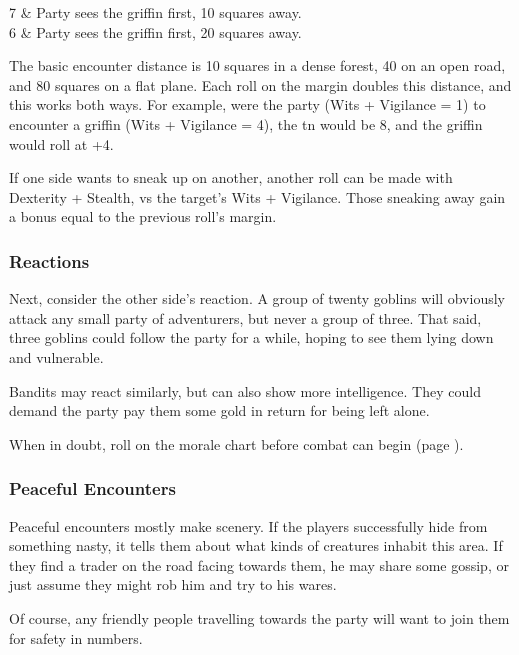 \begin{multicols}{2}
\begin{rollchart}
	7 & Party sees the griffin first, 10 squares away. \\

	6 & Party sees the griffin first, 20 squares away. \\

\end{rollchart}

The basic encounter distance is 10 squares in a dense forest, 40 on an open road, and 80 squares on a flat plane.
Each roll on the margin doubles this distance, and this works both ways.
For example, were the party (Wits + Vigilance = 1) to encounter a griffin (Wits + Vigilance = 4), the \gls{tn} would be 8, and the griffin would roll at +4.

If one side wants to sneak up on another, another roll can be made with Dexterity + Stealth, vs the target's Wits + Vigilance.
Those sneaking away gain a bonus equal to the previous roll's margin.

\subsubsection{Reactions}


Next, consider the other side's reaction.
A group of twenty goblins will obviously attack any small party of adventurers, but never a group of three.
That said, three goblins could follow the party for a while, hoping to see them lying down and vulnerable.

Bandits may react similarly, but can also show more intelligence.
They could demand the party pay them some gold in return for being left alone.

When in doubt, roll on the morale chart before combat can begin (page \pageref{morale}).

\subsubsection{Peaceful Encounters}

Peaceful encounters mostly make scenery.
If the players successfully hide from something nasty, it tells them about what kinds of creatures inhabit this area.
If they find a trader on the road facing towards them, he may share some gossip, or just assume they might rob him and try to his wares.

Of course, any friendly people travelling towards the party will want to join them for safety in numbers.

\end{multicols}

